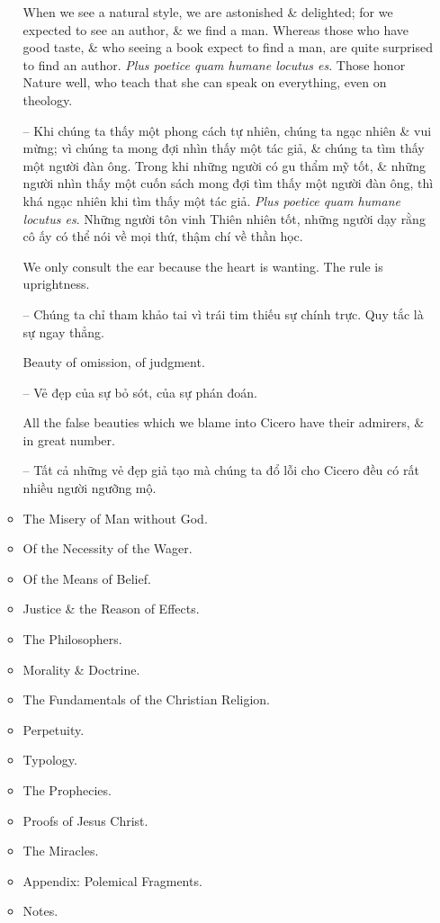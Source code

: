 \documentclass{article}
\begin{document}
\begin{enumerate}
\begin{itemize}
		 When we see a natural style, we are astonished \& delighted; for we expected to see an author, \& we find a man. Whereas those who have good taste, \& who seeing a book expect to find a man, are quite surprised to find an author. {\it Plus poetice quam humane locutus es}. Those honor Nature well, who teach that she can speak on everything, even on theology.
		
		-- Khi chúng ta thấy một phong cách tự nhiên, chúng ta ngạc nhiên \& vui mừng; vì chúng ta mong đợi nhìn thấy một tác giả, \& chúng ta tìm thấy một người đàn ông. Trong khi những người có gu thẩm mỹ tốt, \& những người nhìn thấy một cuốn sách mong đợi tìm thấy một người đàn ông, thì khá ngạc nhiên khi tìm thấy một tác giả. {\it Plus poetice quam humane locutus es}. Những người tôn vinh Thiên nhiên tốt, những người dạy rằng cô ấy có thể nói về mọi thứ, thậm chí về thần học.
				
		 We only consult the ear because the heart is wanting. The rule is uprightness.
		
		-- Chúng ta chỉ tham khảo tai vì trái tim thiếu sự chính trực. Quy tắc là sự ngay thẳng.
		
		Beauty of omission, of judgment.
		
		-- Vẻ đẹp của sự bỏ sót, của sự phán đoán.
		
		 All the false beauties which we blame into Cicero have their admirers, \& in great number.
		
		-- Tất cả những vẻ đẹp giả tạo mà chúng ta đổ lỗi cho Cicero đều có rất nhiều người ngưỡng mộ.
		
		 
		\item {\sf The Misery of Man without God.}
		\item {\sf Of the Necessity of the Wager.}
		\item {\sf Of the Means of Belief.}
		\item {\sf Justice \& the Reason of Effects.}
		\item {\sf The Philosophers.}
		\item {\sf Morality \& Doctrine.}
		\item {\sf The Fundamentals of the Christian Religion.}
		\item {\sf Perpetuity.}
		\item {\sf Typology.}
		\item {\sf The Prophecies.}
		\item {\sf Proofs of Jesus Christ.}
		\item {\sf The Miracles.}
		\item {\sf Appendix: Polemical Fragments.}
		\item {\sf Notes.}
	\end{itemize}
	

\end{enumerate}
\end{document}
